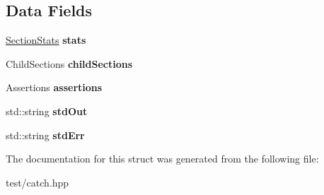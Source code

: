 \subsection*{Data Fields}
\begin{DoxyCompactItemize}
\item 
\hyperlink{structCatch_1_1SectionStats}{Section\+Stats} {\bfseries stats}\hypertarget{structCatch_1_1CumulativeReporterBase_1_1SectionNode_ace54e2e5f29aad1484bfe501478ef686}{}\label{structCatch_1_1CumulativeReporterBase_1_1SectionNode_ace54e2e5f29aad1484bfe501478ef686}

\item 
Child\+Sections {\bfseries child\+Sections}\hypertarget{structCatch_1_1CumulativeReporterBase_1_1SectionNode_a755985897fd2694f9589858050a6cf38}{}\label{structCatch_1_1CumulativeReporterBase_1_1SectionNode_a755985897fd2694f9589858050a6cf38}

\item 
Assertions {\bfseries assertions}\hypertarget{structCatch_1_1CumulativeReporterBase_1_1SectionNode_a23ea83087a7036ad79e822534cfc5b25}{}\label{structCatch_1_1CumulativeReporterBase_1_1SectionNode_a23ea83087a7036ad79e822534cfc5b25}

\item 
std\+::string {\bfseries std\+Out}\hypertarget{structCatch_1_1CumulativeReporterBase_1_1SectionNode_afc6a8c08567d60bb612133632d2992a3}{}\label{structCatch_1_1CumulativeReporterBase_1_1SectionNode_afc6a8c08567d60bb612133632d2992a3}

\item 
std\+::string {\bfseries std\+Err}\hypertarget{structCatch_1_1CumulativeReporterBase_1_1SectionNode_ae8e8c7ef27b55ef96d0f15af231fdfb8}{}\label{structCatch_1_1CumulativeReporterBase_1_1SectionNode_ae8e8c7ef27b55ef96d0f15af231fdfb8}

\end{DoxyCompactItemize}


The documentation for this struct was generated from the following file\+:\begin{DoxyCompactItemize}
\item 
test/catch.\+hpp\end{DoxyCompactItemize}
